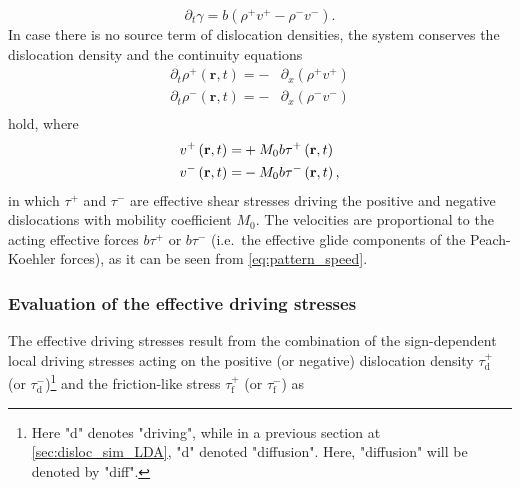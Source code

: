 \[{\partial _t}\gamma  = b\left( {{\rho ^ + }{v^ + } - {\rho ^ - }{v^ - }} \right).\]
In case there is no source term of dislocation densities, the system conserves the dislocation density and the continuity equations 
\[\begin{aligned}
  {\partial _t}{\rho ^ + }\left( {{\mathbf{r}},t} \right) =   -  & {\partial _x}\left( {{\rho ^ + }{v^ + }} \right) \\ 
  {\partial _t}{\rho ^ - }\left( {{\mathbf{r}},t} \right) =   - & {\partial _x}\left( {{\rho ^ - }{v^ - }} \right) \\ 
\end{aligned} \]
hold, where 
\begin{equation}
\begin{aligned} \label{eq:pattern_speed}
  {v^ + }\left( {{\mathbf{r}},t} \right) = & + {M_0}b{\tau ^ + }\left( {{\mathbf{r}},t} \right) \hfill \\
  {v^ - }\left( {{\mathbf{r}},t} \right) = & - {M_0}b{\tau ^ - }\left( {{\mathbf{r}},t} \right),
\end{aligned}
\end{equation}
in which ${\tau ^+ }$ and ${\tau ^- }$ are effective shear stresses driving the positive and negative dislocations with mobility coefficient $M_0$. The velocities are proportional to the acting effective forces $b \tau^+ $ or $b \tau ^-$ (i.e.\ the effective glide components of the Peach-Koehler forces), as it can be seen from \cref{eq:pattern_speed}.

\subsubsection{Evaluation of the effective driving stresses}

The effective driving stresses result from the combination of the sign-dependent local driving stresses acting on the positive (or negative) dislocation density $\tau _{\text{d}}^ + $ (or $\tau _{\text{d}}^ - $)\footnote{Here "d" denotes "driving", while in a previous section at \ref{sec:disloc_sim_LDA}, "d" denoted "diffusion". Here, "diffusion" will be denoted by "diff".} and the friction-like stress $\tau _{\text{f}}^ + $ (or $\tau _{\text{f}}^ - $) as

